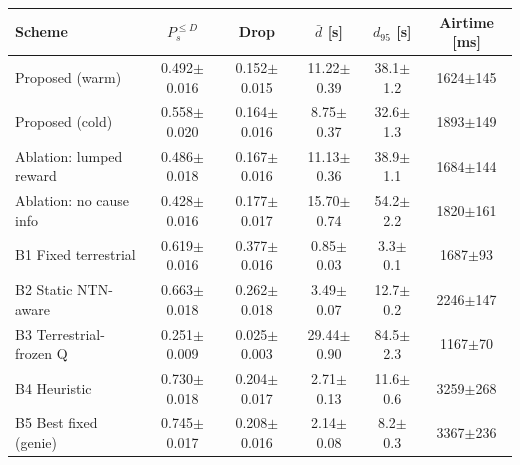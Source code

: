 \begin{tabular}{lccccc}
\toprule
Scheme & $P_s^{\le D}$ & Drop & $\bar d$ [s] & $d_{95}$ [s] & Airtime [ms] \\
\midrule
Proposed (warm) & 0.492$\pm$0.016 & 0.152$\pm$0.015 & 11.22$\pm$0.39 & 38.1$\pm$1.2 & 1624$\pm$145 \\
Proposed (cold) & 0.558$\pm$0.020 & 0.164$\pm$0.016 & 8.75$\pm$0.37 & 32.6$\pm$1.3 & 1893$\pm$149 \\
Ablation: lumped reward & 0.486$\pm$0.018 & 0.167$\pm$0.016 & 11.13$\pm$0.36 & 38.9$\pm$1.1 & 1684$\pm$144 \\
Ablation: no cause info & 0.428$\pm$0.016 & 0.177$\pm$0.017 & 15.70$\pm$0.74 & 54.2$\pm$2.2 & 1820$\pm$161 \\
B1 Fixed terrestrial & 0.619$\pm$0.016 & 0.377$\pm$0.016 & 0.85$\pm$0.03 & 3.3$\pm$0.1 & 1687$\pm$93 \\
B2 Static NTN-aware & 0.663$\pm$0.018 & 0.262$\pm$0.018 & 3.49$\pm$0.07 & 12.7$\pm$0.2 & 2246$\pm$147 \\
B3 Terrestrial-frozen Q & 0.251$\pm$0.009 & 0.025$\pm$0.003 & 29.44$\pm$0.90 & 84.5$\pm$2.3 & 1167$\pm$70 \\
B4 Heuristic & 0.730$\pm$0.018 & 0.204$\pm$0.017 & 2.71$\pm$0.13 & 11.6$\pm$0.6 & 3259$\pm$268 \\
B5 Best fixed (genie) & 0.745$\pm$0.017 & 0.208$\pm$0.016 & 2.14$\pm$0.08 & 8.2$\pm$0.3 & 3367$\pm$236 \\
\bottomrule
\end{tabular}